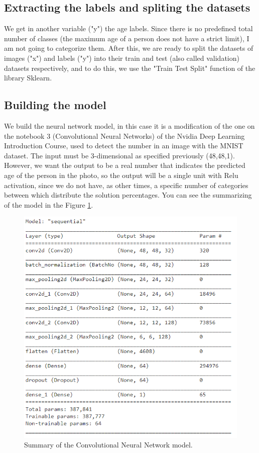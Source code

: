 \documentclass{article}
\begin{document}
\subsection{Extracting the labels and spliting the datasets}
We get in another variable ("y") the age labels. Since there is no predefined total number of classes (the maximum age of a person does not have a strict limit), I am not going to categorize them.
After this, we are ready to split the datasets of images ("x") and labels ("y") into their train and test (also called validation) datasets respectively, and to do this, we use the "Train Test Split" function of the library Sklearn.

\subsection{Building the model}
We build the neural network model, in this case it is a modification of the one on the notebook 3 (Convolutional Neural Networks) of the Nvidia Deep Learning Introduction Course\cite{nvidiacourse}, used to detect the number in an image with the MNIST dataset. The input must be 3-dimensional as specified previously (48,48,1). However, we want the output to be a real number that indicates the predicted age of the person in the photo, so the output will be a single unit with Relu activation, since we do not have, as other times, a specific number of categories between which distribute the solution percentages.
You can see the summarizing of the model in the Figure \ref{fig:model}.

\begin{figure}[t]
\centering
\includegraphics[width=1\columnwidth]{model-summary.png}
\caption{Summary of the Convolutional Neural Network model.\label{fig:model}}
\end{figure}
\end{document}
